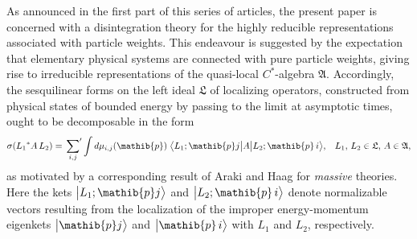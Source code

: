 \documentclass[a4paper,a4paper]{article}
\numberwithin{equation}{section}
\newcommand{\Afrak}{\mathfrak{A}}
\newcommand{\Lfrak}{\mathfrak{L}}
\newcommand{\pib}{\mathib{p}}
\theoremstyle{definition}
\theoremstyle{plain}
\theoremstyle{remark}
\theoremstyle{assumption}
\newcommand{\bket}[1]{\big\vert #1 \bigr\rangle}
\newcommand{\bscpx}[3]{\bigl\langle #1 \big\vert #2 \big\vert #3
  \bigr\rangle}
\begin{document}
  As announced in the first part of this series of articles, the
  present paper is concerned with a disintegration theory for the
  highly reducible representations associated with particle weights.
  This endeavour is suggested by the expectation that elementary
  physical systems are connected with pure particle weights, giving
  rise to irreducible representations of the quasi-local $C^*$-algebra
  $\Afrak$. Accordingly, the sesquilinear forms on the left ideal
  $\Lfrak$ of localizing operators, constructed from physical states
  of bounded energy by passing to the limit at asymptotic times, ought
  to be decomposable in the form
  \begin{equation}
    \label{eq:araki/haag-weight-reformulated}
    \sigma ( {L_1}^* A \, L_2) = \sideset{}{'} \sum_{i , j} \int d
    \mu_{i , j} ( \pib ) \; \bscpx{L_1 ; \pib j}{A}{L_2 ; \pib \, i}
    \text{,} \quad L_1 \text{, } L_2 \in \Lfrak \text{, } A \in \Afrak
    \text{,}
  \end{equation}
  as motivated by a corresponding result of Araki and Haag
  \cite[Theorem~4]{araki/haag:1967} for \emph{massive} theories. Here
  the kets $\bket{L_1 ; \pib j}$ and $\bket{L_2 ; \pib \, i}$ denote
  normalizable vectors resulting from the localization of the improper
  energy-momentum eigenkets $\bket{\pib j}$ and $\bket{\pib \, i}$
  with $L_1$ and $L_2$, respectively.
  
\end{document}
